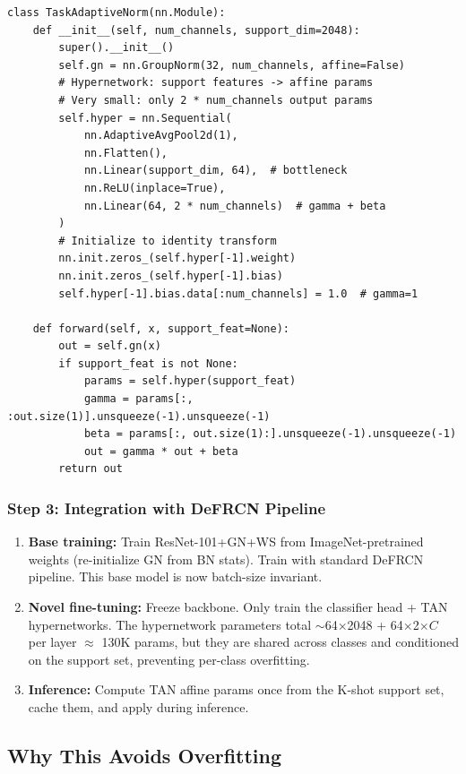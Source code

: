 \documentclass[11pt,a4paper]{article}
\begin{document}
\begin{lstlisting}[caption={Task-Adaptive Normalization module}]
class TaskAdaptiveNorm(nn.Module):
    def __init__(self, num_channels, support_dim=2048):
        super().__init__()
        self.gn = nn.GroupNorm(32, num_channels, affine=False)
        # Hypernetwork: support features -> affine params
        # Very small: only 2 * num_channels output params
        self.hyper = nn.Sequential(
            nn.AdaptiveAvgPool2d(1),
            nn.Flatten(),
            nn.Linear(support_dim, 64),  # bottleneck
            nn.ReLU(inplace=True),
            nn.Linear(64, 2 * num_channels)  # gamma + beta
        )
        # Initialize to identity transform
        nn.init.zeros_(self.hyper[-1].weight)
        nn.init.zeros_(self.hyper[-1].bias)
        self.hyper[-1].bias.data[:num_channels] = 1.0  # gamma=1

    def forward(self, x, support_feat=None):
        out = self.gn(x)
        if support_feat is not None:
            params = self.hyper(support_feat)
            gamma = params[:, :out.size(1)].unsqueeze(-1).unsqueeze(-1)
            beta = params[:, out.size(1):].unsqueeze(-1).unsqueeze(-1)
            out = gamma * out + beta
        return out
\end{lstlisting}

\subsubsection{Step 3: Integration with DeFRCN Pipeline}

\begin{enumerate}[nosep]
    \item \textbf{Base training:} Train ResNet-101+GN+WS from ImageNet-pretrained weights (re-initialize GN from BN stats). Train with standard DeFRCN pipeline. This base model is now batch-size invariant.
    \item \textbf{Novel fine-tuning:} Freeze backbone. Only train the classifier head + TAN hypernetworks. The hypernetwork parameters total $\sim$64$\times$2048 + 64$\times$2$\times C$ per layer $\approx$ 130K params, but they are shared across classes and conditioned on the support set, preventing per-class overfitting.
    \item \textbf{Inference:} Compute TAN affine params once from the K-shot support set, cache them, and apply during inference.
\end{enumerate}

\subsection{Why This Avoids Overfitting}
\end{document}

